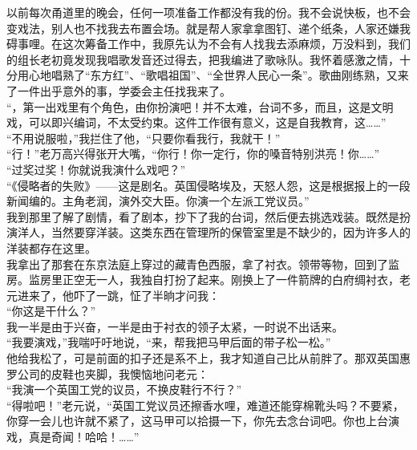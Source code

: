 以前每次甬道里的晚会，任何一项准备工作都没有我的份。我不会说快板，也不会变戏法，别人也不找我去布置会场。就是帮人家拿拿图钉、递个纸条，人家还嫌我碍事哩。在这次筹备工作中，我原先认为不会有人找我去添麻烦，万没料到，我们的组长老初竟发现我唱歌发音还过得去，把我编进了歌咏队。我怀着感激之情，十分用心地唱熟了“东方红”、“歌唱祖国”、“全世界人民心一条”。歌曲刚练熟，又来了一件出乎意外的事，学委会主任找我来了。\\

“，第一出戏里有个角色，由你扮演吧！并不太难，台词不多，而且，这是文明戏，可以即兴编词，不太受约束。这件工作很有意义，这是自我教育，这……”\\

“不用说服啦，”我拦住了他，“只要你看我行，我就干！”\\

“行！”老万高兴得张开大嘴，“你行！你一定行，你的嗓音特别洪亮！你……”\\

“过奖过奖！你就说我演什么戏吧？”\\

“《侵略者的失败》——这是剧名。英国侵略埃及，天怒人怨，这是根据报上的一段新闻编的。主角老润，演外交大臣。你演一个左派工党议员。”\\

我到那里了解了剧情，看了剧本，抄下了我的台词，然后便去挑选戏装。既然是扮演洋人，当然要穿洋装。这类东西在管理所的保管室里是不缺少的，因为许多人的洋装都存在这里。\\

我拿出了那套在东京法庭上穿过的藏青色西服，拿了衬衣。领带等物，回到了监房。监房里正空无一人，我独自打扮了起来。刚换上了一件箭牌的白府绸衬衣，老元进来了，他吓了一跳，怔了半晌才问我：\\

“你这是干什么？”\\

我一半是由于兴奋，一半是由于衬衣的领子太紧，一时说不出话来。\\

“我要演戏，”我喘吁吁地说，“来，帮我把马甲后面的带子松一松。”\\

他给我松了，可是前面的扣子还是系不上，我才知道自己比从前胖了。那双英国惠罗公司的皮鞋也夹脚，我懊恼地问老元：\\

“我演一个英国工党的议员，不换皮鞋行不行？”\\

“得啦吧！”老元说，“英国工党议员还擦香水哩，难道还能穿棉靴头吗？不要紧，你穿一会儿也许就不紧了，这马甲可以拾摄一下，你先去念台词吧。你也上台演戏，真是奇闻！哈哈！……”\\

